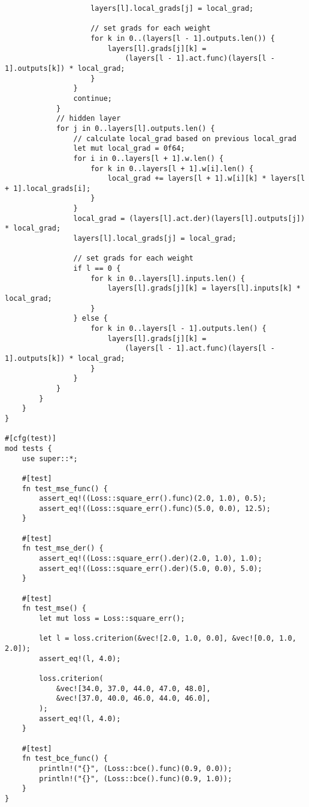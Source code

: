 \begin{code}
\begin{verbatim}
                    layers[l].local_grads[j] = local_grad;

                    // set grads for each weight
                    for k in 0..(layers[l - 1].outputs.len()) {
                        layers[l].grads[j][k] =
                            (layers[l - 1].act.func)(layers[l - 1].outputs[k]) * local_grad;
                    }
                }
                continue;
            }
            // hidden layer
            for j in 0..layers[l].outputs.len() {
                // calculate local_grad based on previous local_grad
                let mut local_grad = 0f64;
                for i in 0..layers[l + 1].w.len() {
                    for k in 0..layers[l + 1].w[i].len() {
                        local_grad += layers[l + 1].w[i][k] * layers[l + 1].local_grads[i];
                    }
                }
                local_grad = (layers[l].act.der)(layers[l].outputs[j]) * local_grad;
                layers[l].local_grads[j] = local_grad;

                // set grads for each weight
                if l == 0 {
                    for k in 0..layers[l].inputs.len() {
                        layers[l].grads[j][k] = layers[l].inputs[k] * local_grad;
                    }
                } else {
                    for k in 0..layers[l - 1].outputs.len() {
                        layers[l].grads[j][k] =
                            (layers[l - 1].act.func)(layers[l - 1].outputs[k]) * local_grad;
                    }
                }
            }
        }
    }
}

#[cfg(test)]
mod tests {
    use super::*;

    #[test]
    fn test_mse_func() {
        assert_eq!((Loss::square_err().func)(2.0, 1.0), 0.5);
        assert_eq!((Loss::square_err().func)(5.0, 0.0), 12.5);
    }

    #[test]
    fn test_mse_der() {
        assert_eq!((Loss::square_err().der)(2.0, 1.0), 1.0);
        assert_eq!((Loss::square_err().der)(5.0, 0.0), 5.0);
    }

    #[test]
    fn test_mse() {
        let mut loss = Loss::square_err();

        let l = loss.criterion(&vec![2.0, 1.0, 0.0], &vec![0.0, 1.0, 2.0]);
        assert_eq!(l, 4.0);

        loss.criterion(
            &vec![34.0, 37.0, 44.0, 47.0, 48.0],
            &vec![37.0, 40.0, 46.0, 44.0, 46.0],
        );
        assert_eq!(l, 4.0);
    }

    #[test]
    fn test_bce_func() {
        println!("{}", (Loss::bce().func)(0.9, 0.0));
        println!("{}", (Loss::bce().func)(0.9, 1.0));
    }
}

\end{verbatim}
\end{code}

